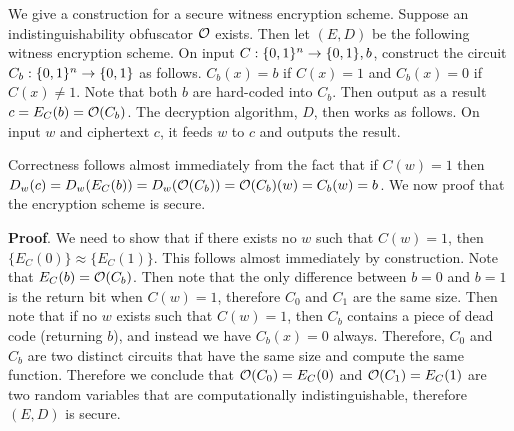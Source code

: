 \documentclass{article}
\begin{document}
\begin{enumerate}
\begin{enumerate}[noitemsep,topsep=\mdcompacttopsep,label=\alph*.]
We give a construction for a secure witness encryption scheme. Suppose an indistinguishability 
obfuscator $\mathcal{O}$ exists. Then let $(E,D)$ be the following witness encryption scheme. On input
$C:\{0,1\}^n \to \{0,1\},b$, construct the circuit $C_b:\{0,1\}^n \to \{0,1\}$ as follows. $C_b(x) = b$ if $C(x) = 1$ 
and $C_b(x) = 0$ if $C(x) \neq 1$. Note that both $b$ are hard-coded into $C_b$.\mdbr
{}Then output as a result $c = E_C(b) = \mathcal{O}(C_b)$. The decryption algorithm, $D$, then works as follows. On input
$w$ and ciphertext $c$, it feeds $w$ to $c$ and outputs the result.%

Correctness follows almost immediately from the fact that if $C(w) = 1$ then $D_w(c) = D_w(E_C(b)) = D_w(\mathcal{O}(C_b)) = \mathcal{O}(C_b)(w) = C_b(w) = b$.%
We now proof that the encryption scheme is secure.

\begin{mdbmarginx}{1ex}{0pt}{1ex}{0pt}%
\noindent{}\textbf{Proof}.  We need to show that if there exists no $w$ such that $C(w) = 1$, then $\{ E_C(0) \} \approx \{E_C(1) \}$.
This follows almost immediately by construction. Note that $E_C(b) = \mathcal{O}(C_b)$. Then note that 
the only difference between $b = 0$ and $b = 1$ is the return bit when $C(w) = 1$, therefore 
$C_0$ and $C_1$ are the same size. Then note that if no $w$ exists
such that $C(w) = 1$, then $C_b$ contains a piece of dead code (returning $b$), and instead we have
$C_b(x) = 0$ always. Therefore, $C_0$ and $C_b$ are two distinct circuits that have the same
size and compute the same function. Therefore we conclude that $\mathcal{O}(C_0)= E_C(0)$ and $\mathcal{O}(C_1) = E_C(1)$ are
two random variables that are computationally indistinguishable, therefore $(E,D)$ is secure.%
\end{mdbmarginx}%
\end{enumerate}%


\end{enumerate}
\end{document}
